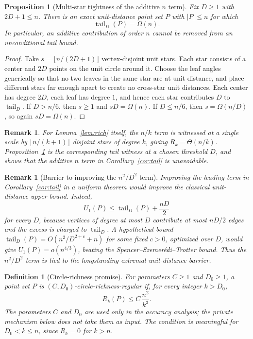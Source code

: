 \documentclass[11pt]{article}
\newtheorem{proposition}[theorem]{Proposition}
\newtheorem{definition}[theorem]{Definition}
\newtheorem{remark}[theorem]{Remark}
\newcommand{\tail}{\operatorname{tail}}
\begin{document}
\begin{proposition}[Multi-star tightness of the additive \(n\) term]
\label{prop:multistar}
Fix \(D\ge 1\) with \(2D+1\le n\). There is an exact unit-distance point set \(P\) with \(|P|\le n\) for which
\[
\tail_D(P)=\Omega(n).
\]
In particular, an additive contribution of order \(n\) cannot be removed from an unconditional tail bound.
\end{proposition}

\begin{proof}
Take \(s=\lfloor n/(2D+1)\rfloor\) vertex-disjoint unit stars. Each star consists of a center and \(2D\) points on the unit circle around it. Choose the leaf angles generically so that no two leaves in the same star are at unit distance, and place different stars far enough apart to create no cross-star unit distances. Each center has degree \(2D\), each leaf has degree \(1\), and hence each star contributes \(D\) to \(\tail_D\). If \(D>n/6\), then \(s\ge 1\) and \(sD=\Omega(n)\). If \(D\le n/6\), then \(s=\Omega(n/D)\), so again \(sD=\Omega(n)\).
\end{proof}

\begin{remark}
For Lemma~\ref{lem:rich} itself, the \(n/k\) term is witnessed at a single scale by \(\lfloor n/(k+1)\rfloor\) disjoint stars of degree \(k\), giving \(R_k=\Theta(n/k)\). Proposition~\ref{prop:multistar} is the corresponding tail witness at a chosen threshold \(D\), and shows that the additive \(n\) term in Corollary~\ref{cor:tail} is unavoidable.
\end{remark}

\begin{remark}[Barrier to improving the \(n^2/D^2\) term]
\label{rem:tail-barrier}
Improving the leading term in Corollary~\ref{cor:tail} in a uniform theorem would improve the classical unit-distance upper bound. Indeed,
\[
U_1(P)\le \tail_D(P)+\frac{nD}{2}
\]
for every \(D\), because vertices of degree at most \(D\) contribute at most \(nD/2\) edges and the excess is charged to \(\tail_D\). A hypothetical bound \(\tail_D(P)=O(n^2/D^{2+c}+n)\) for some fixed \(c>0\), optimized over \(D\), would give \(U_1(P)=o(n^{4/3})\), beating the Spencer--Szemerédi--Trotter bound. Thus the \(n^2/D^2\) term is tied to the longstanding extremal unit-distance barrier.
\end{remark}

\begin{definition}[Circle-richness promise]
\label{def:circle-rich}
For parameters \(C\ge 1\) and \(D_0\ge 1\), a point set \(P\) is \((C,D_0)\)-circle-richness-regular if, for every integer \(k>D_0\),
\[
R_k(P)\le C\,\frac{n^2}{k^3}.
\]
The parameters \(C\) and \(D_0\) are used only in the accuracy analysis; the private mechanism below does not take them as input. The condition is meaningful for \(D_0<k\le n\), since \(R_k=0\) for \(k>n\).
\end{definition}
\end{document}
